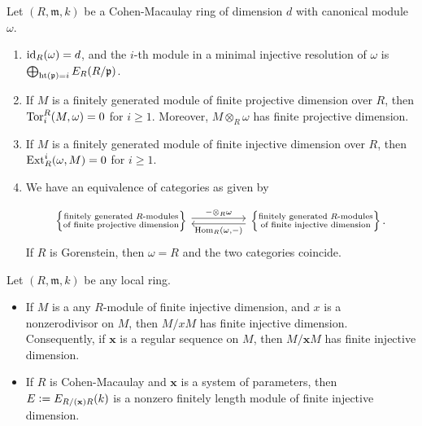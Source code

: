 \documentclass[12pt]{article}
\begin{document}
\begin{thm}
	Let $(R, \mathfrak{m}, k)$ be a Cohen-Macaulay ring of dimension $d$ with canonical module $\omega$.
	\begin{enumerate}[label=(\alph*)]
		\item $\operatorname{id}_{R}(\omega) = d$, and the $i$-th module in a minimal injective resolution of $\omega$ is $\bigoplus_{\operatorname{ht}(\mathfrak{p}) = i} E_{R}(R/\mathfrak{p})$.
		\item If $M$ is a finitely generated module of finite projective dimension over $R$, then $\operatorname{Tor}^{R}_{i}(M, \omega) = 0$ for $i \ge 1$. \newline
		Moreover, $M \otimes_{R} \omega$ has finite projective dimension.
		\item If $M$ is a finitely generated module of finite injective dimension over $R$, then $\operatorname{Ext}_{R}^{i}(\omega, M) = 0$ for $i \ge 1$.
		\item We have an equivalence of categories as given by

		\begin{equation*} 
			\begin{tikzcd}
				\left\{\substack{\text{finitely generated $R$-modules} \\ \text{of finite projective dimension}}\right\} \arrow[rr, "- \otimes_{R} \omega", shift left] & & \left\{\substack{\text{finitely generated $R$-modules} \\ \text{of finite injective dimension}}\right\}. \arrow[ll, "{\Hom_{R}(\omega, -)}", shift left]
			\end{tikzcd}
		\end{equation*}
		If $R$ is Gorenstein, then $\omega = R$ and the two categories coincide.
	\end{enumerate}
\end{thm}

\begin{exe}
	Let $(R, \mathfrak{m}, k)$ be any local ring.
	\begin{itemize}
		\item If $M$ is a any $R$-module of finite injective dimension, and $x$ is a nonzerodivisor on $M$, then $M/xM$ has finite injective dimension. \newline
		Consequently, if $\mathbf{x}$ is a regular sequence on $M$, then $M/\mathbf{x}M$ has finite injective dimension.
		\item If $R$ is Cohen-Macaulay and $\mathbf{x}$ is a system of parameters, then $E \vcentcolon= E_{R/(\mathbf{x})R}(k)$ is a nonzero finitely length module of finite injective dimension.
	\end{itemize}
\end{exe}
\end{document}
